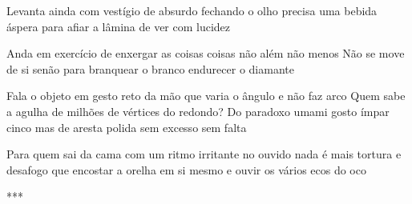\begin{poem}
\begin{stanza}
Levanta ainda com vestígio\verseline
de absurdo fechando o olho\verseline
precisa uma bebida áspera
para afiar a lâmina\verseline
de ver com lucidez
\end{stanza}
\begin{stanza}
Anda em exercício\verseline
de enxergar as coisas coisas\verseline
não além não menos\verseline
Não se move de si senão para\verseline
branquear o branco\verseline
endurecer o diamante
\end{stanza}
\begin{stanza}
Fala o objeto em gesto reto\verseline
da mão\verseline
que varia o ângulo\verseline
e não faz arco\verseline
Quem sabe a agulha\verseline
de milhões de vértices\verseline
do redondo?\verseline
Do paradoxo umami\verseline
gosto ímpar\verseline
cinco\verseline
mas de aresta polida\verseline
sem excesso sem falta
\end{stanza}
\begin{stanza}
Para quem sai da cama\verseline
com um ritmo irritante\verseline
no ouvido\verseline
nada é mais tortura e desafogo\verseline
que encostar a orelha\verseline
em si mesmo e ouvir\verseline
os vários ecos do oco
\end{stanza}
\begin{stanza}
***
\end{stanza}
\end{poem}
